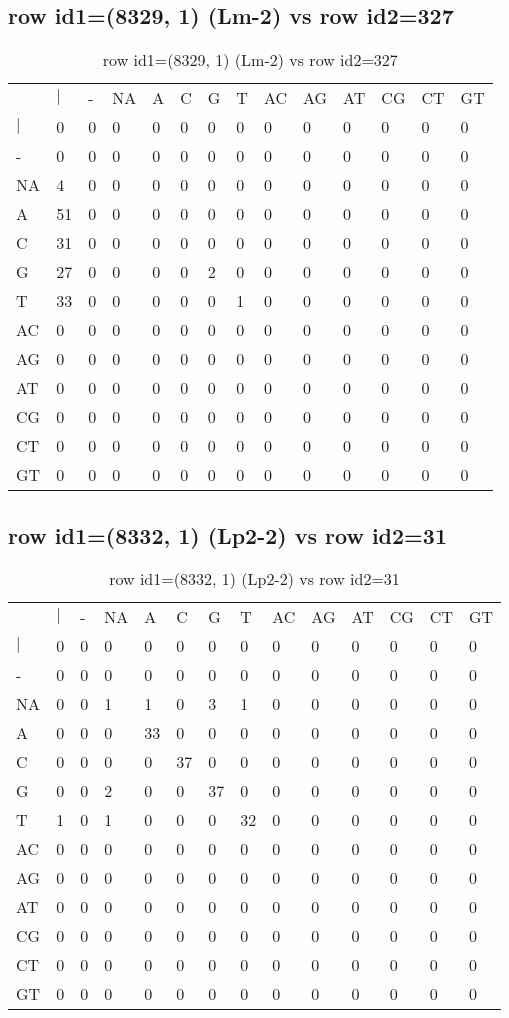 \subsection{row id1=(8329, 1) (Lm-2) vs row id2=327}
\begin{center}
\begin{longtable}{|l|l|l|l|l|l|l|l|l|l|l|l|l|l|}
\caption{row id1=(8329, 1) (Lm-2) vs row id2=327} \label{table_dm524}\\
\hline
\\
\hline
&$|$&-&NA&A&C&G&T&AC&AG&AT&CG&CT&GT\\
$|$&0&0&0&0&0&0&0&0&0&0&0&0&0\\
-&0&0&0&0&0&0&0&0&0&0&0&0&0\\
NA&4&0&0&0&0&0&0&0&0&0&0&0&0\\
A&51&0&0&0&0&0&0&0&0&0&0&0&0\\
C&31&0&0&0&0&0&0&0&0&0&0&0&0\\
G&27&0&0&0&0&2&0&0&0&0&0&0&0\\
T&33&0&0&0&0&0&1&0&0&0&0&0&0\\
AC&0&0&0&0&0&0&0&0&0&0&0&0&0\\
AG&0&0&0&0&0&0&0&0&0&0&0&0&0\\
AT&0&0&0&0&0&0&0&0&0&0&0&0&0\\
CG&0&0&0&0&0&0&0&0&0&0&0&0&0\\
CT&0&0&0&0&0&0&0&0&0&0&0&0&0\\
GT&0&0&0&0&0&0&0&0&0&0&0&0&0\\
\hline
\end{longtable}
\end{center}

\subsection{row id1=(8332, 1) (Lp2-2) vs row id2=31}
\begin{center}
\begin{longtable}{|l|l|l|l|l|l|l|l|l|l|l|l|l|l|}
\caption{row id1=(8332, 1) (Lp2-2) vs row id2=31} \label{table_dm526}\\
\hline
\\
\hline
&$|$&-&NA&A&C&G&T&AC&AG&AT&CG&CT&GT\\
$|$&0&0&0&0&0&0&0&0&0&0&0&0&0\\
-&0&0&0&0&0&0&0&0&0&0&0&0&0\\
NA&0&0&1&1&0&3&1&0&0&0&0&0&0\\
A&0&0&0&33&0&0&0&0&0&0&0&0&0\\
C&0&0&0&0&37&0&0&0&0&0&0&0&0\\
G&0&0&2&0&0&37&0&0&0&0&0&0&0\\
T&1&0&1&0&0&0&32&0&0&0&0&0&0\\
AC&0&0&0&0&0&0&0&0&0&0&0&0&0\\
AG&0&0&0&0&0&0&0&0&0&0&0&0&0\\
AT&0&0&0&0&0&0&0&0&0&0&0&0&0\\
CG&0&0&0&0&0&0&0&0&0&0&0&0&0\\
CT&0&0&0&0&0&0&0&0&0&0&0&0&0\\
GT&0&0&0&0&0&0&0&0&0&0&0&0&0\\
\hline
\end{longtable}
\end{center}

